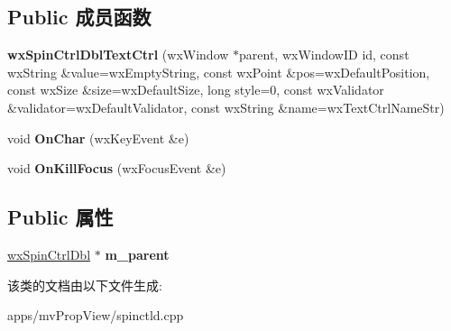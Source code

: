 \subsection*{Public 成员函数}
\begin{DoxyCompactItemize}
\item 
\hypertarget{classwx_spin_ctrl_dbl_text_ctrl_a336392bc26ddb8dec3a889f10e21de99}{{\bfseries wx\+Spin\+Ctrl\+Dbl\+Text\+Ctrl} (wx\+Window $\ast$parent, wx\+Window\+I\+D id, const wx\+String \&value=wx\+Empty\+String, const wx\+Point \&pos=wx\+Default\+Position, const wx\+Size \&size=wx\+Default\+Size, long style=0, const wx\+Validator \&validator=wx\+Default\+Validator, const wx\+String \&name=wx\+Text\+Ctrl\+Name\+Str)}\label{classwx_spin_ctrl_dbl_text_ctrl_a336392bc26ddb8dec3a889f10e21de99}

\item 
\hypertarget{classwx_spin_ctrl_dbl_text_ctrl_a815855b12d6cfee49d69564803ea1fc2}{void {\bfseries On\+Char} (wx\+Key\+Event \&e)}\label{classwx_spin_ctrl_dbl_text_ctrl_a815855b12d6cfee49d69564803ea1fc2}

\item 
\hypertarget{classwx_spin_ctrl_dbl_text_ctrl_a8abe16b79fe1f1b77bcec512b9255ab0}{void {\bfseries On\+Kill\+Focus} (wx\+Focus\+Event \&e)}\label{classwx_spin_ctrl_dbl_text_ctrl_a8abe16b79fe1f1b77bcec512b9255ab0}

\end{DoxyCompactItemize}
\subsection*{Public 属性}
\begin{DoxyCompactItemize}
\item 
\hypertarget{classwx_spin_ctrl_dbl_text_ctrl_ae9a04167a152ebec8402031e8c23de72}{\hyperlink{classwx_spin_ctrl_dbl}{wx\+Spin\+Ctrl\+Dbl} $\ast$ {\bfseries m\+\_\+parent}}\label{classwx_spin_ctrl_dbl_text_ctrl_ae9a04167a152ebec8402031e8c23de72}

\end{DoxyCompactItemize}


该类的文档由以下文件生成\+:\begin{DoxyCompactItemize}
\item 
apps/mv\+Prop\+View/spinctld.\+cpp\end{DoxyCompactItemize}
